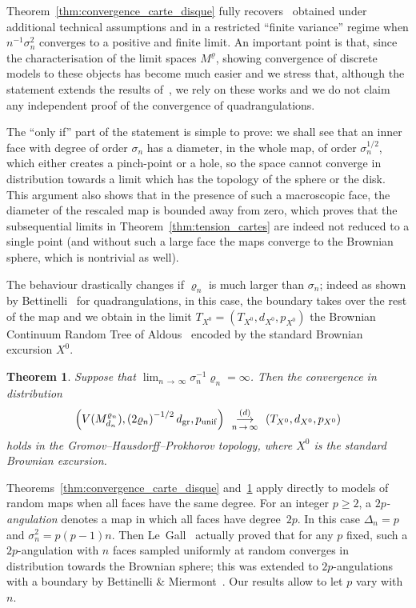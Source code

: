 \documentclass[10pt]{amsart}
\newtheorem{theo}{Theorem}[section]
\theoremstyle{definition}\newtheorem{defi}[theo]{Definition}\newtheorem{rema}[theo]{Remark}\newtheorem{exam}[theo]{Example}\newtheorem{exem}[theo]{Example}\newtheorem{nota}[theo]{Notation}
\newcommand{\1}{\ensembles{1}}
\renewcommand{\ge}{\geqslant}
\newcommand{\Bmap}{M}
\newcommand{\CRT}{T}
\newcommand{\dCRT}{d}
\newcommand{\pCRT}{p}
\newcommand{\mn}{M_{d_n}^{\varrho_n}}
\newcommand{\dgr}{d_{\mathrm{gr}}}
\newcommand{\pgr}{p_{\mathrm{unif}}}
\newcommand{\cvloi}[1][n]{\enskip\mathop{\longrightarrow}^{(d)}_{#1\,\to\, \infty}\enskip}
\providecommand{\?}{}
\begin{document}
Theorem~\ref{thm:convergence_carte_disque} fully recovers~\cite[Theorem~1]{Mar18b} obtained under additional technical assumptions and in a restricted ``finite variance'' regime when $n^{-1} \sigma_n^2$ converges to a positive and finite limit. An important point is that, since the characterisation of the limit spaces $\Bmap^\varrho$, showing convergence of discrete models to these objects has become much easier and we stress that, although the statement extends the results of~\cite{BM17,LG13, Mie13}, we rely on these works and we do not claim any independent proof of the convergence of quadrangulations.


The ``only if'' part of the statement is simple to prove: we shall see that an inner face with degree of order $\sigma_n$ has a diameter, in the whole map, of order $\sigma_n^{1/2}$, which either creates a pinch-point or a hole, so the space cannot converge in distribution towards a limit which has the topology of the sphere or the disk. This argument also shows that in the presence of such a macroscopic face, the diameter of the rescaled map is bounded away from zero, which proves that the subsequential limits in Theorem~\ref{thm:tension_cartes} are indeed not reduced to a single point (and without such a large face the maps converge to the Brownian sphere, which is nontrivial as well).


The behaviour drastically changes if $\varrho_n$ is much larger than $\sigma_n$; indeed as shown by Bettinelli~\cite[Theorem~5]{Bet15} for quadrangulations, in this case, the boundary takes over the rest of the map and we obtain in the limit $\CRT_{X^0} = (\CRT_{X^0}, \dCRT_{X^0}, \pCRT_{X^0})$ the Brownian Continuum Random Tree of Aldous~\cite{Ald93} encoded by the standard Brownian excursion $X^0$.

\begin{theo}\label{thm:convergence_cartes_CRT}
Suppose that $\lim_{n\,\to\,\infty} \sigma_n^{-1} \varrho_n = \infty$. Then the convergence in distribution
\[
\left(V(\mn), \left(2\varrho_n\right)^{-1/2} \dgr, \pgr\right) \cvloi \left(\CRT_{X^0}, \dCRT_{X^0}, \pCRT_{X^0}\right)
\]
holds in the Gromov--Hausdorff--Prokhorov topology, where $X^0$ is the standard Brownian excursion.
\end{theo}

Theorems~\ref{thm:convergence_carte_disque} and~\ref{thm:convergence_cartes_CRT} apply directly to models of random maps when all faces have the same degree. For an integer $p \ge 2$, a \emph{$2p$-angulation} denotes a map in which all faces have degree~$2p$. In this case $\Delta_n = p$ and $\sigma_n^2 = p(p-1)n$. Then Le~Gall~\cite[Theorem~1]{LG13} actually proved that for any $p$ fixed, such a $2p$-angulation with $n$ faces sampled uniformly at random converges in distribution towards the Brownian sphere; this was extended to $2p$-angulations with a boundary by Bettinelli \& Miermont~\cite[Corollary~6]{BM17}. Our results allow to let $p$ vary with $n$.
\end{document}
